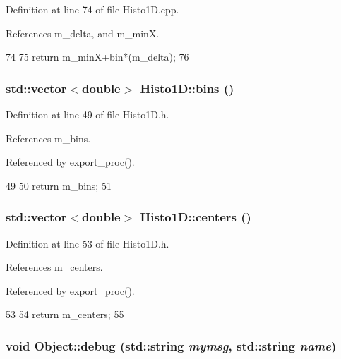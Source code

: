 Definition at line 74 of file Histo1D.cpp.

References m\_\-delta, and m\_\-minX.


\begin{DoxyCode}
74                                             {
75   return m_minX+bin*(m_delta);
76 }
\end{DoxyCode}
\hypertarget{classHisto1D_aaa8cd492ee25a3ad1b1694349fb1024c}{
\subsubsection[{bins}]{\setlength{\rightskip}{0pt plus 5cm}std::vector$<$double$>$ Histo1D::bins ()}}
\label{classHisto1D_aaa8cd492ee25a3ad1b1694349fb1024c}


Definition at line 49 of file Histo1D.h.

References m\_\-bins.

Referenced by export\_\-proc().


\begin{DoxyCode}
49                           {  
50     return m_bins;
51   }
\end{DoxyCode}
\hypertarget{classHisto1D_a07fd41679a3255cdd44d4dcf8865adb7}{
\subsubsection[{centers}]{\setlength{\rightskip}{0pt plus 5cm}std::vector$<$double$>$ Histo1D::centers ()}}
\label{classHisto1D_a07fd41679a3255cdd44d4dcf8865adb7}


Definition at line 53 of file Histo1D.h.

References m\_\-centers.

Referenced by export\_\-proc().


\begin{DoxyCode}
53                              {  
54     return m_centers;
55   }
\end{DoxyCode}
\hypertarget{classObject_a6c9a0397ca804e04d675ed05683f5420}{
\subsubsection[{debug}]{\setlength{\rightskip}{0pt plus 5cm}void Object::debug (std::string {\em mymsg}, \/  std::string {\em name})}}
\label{classObject_a6c9a0397ca804e04d675ed05683f5420}


